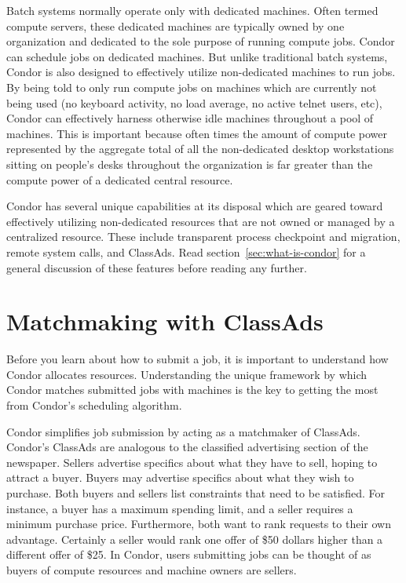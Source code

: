 Batch systems normally operate only with dedicated machines.  Often 
termed compute servers, these dedicated machines are typically owned by
one organization and dedicated to the sole purpose of running compute
jobs.  Condor can schedule jobs on dedicated machines.  But unlike traditional 
batch systems, Condor is also designed to effectively 
utilize non-dedicated machines to run jobs.  By being told to only
run compute jobs on machines which are currently not being used (no keyboard
activity, no load average, no active telnet users, etc), Condor can
effectively harness otherwise idle machines throughout a pool of machines.
This is important because often times the amount of
compute power represented by the aggregate total of all the non-dedicated 
desktop workstations sitting on people's desks throughout the
organization is far greater than the compute power of a dedicated
central resource.

Condor has several unique capabilities at its disposal which are geared 
toward effectively utilizing non-dedicated resources that are not owned or
managed by a centralized resource. These include transparent process
checkpoint and migration, remote system calls, and ClassAds.
Read section~\ref{sec:what-is-condor} for a general 
discussion of these features before reading any further.


\section{Matchmaking with ClassAds}
\label{sec:matchmaking-with-classads}

Before you learn about how to submit a job, it is important to
understand how Condor allocates resources. 
Understanding the
unique framework by which Condor matches submitted jobs with machines is
the key to getting the most from Condor's scheduling algorithm. 

Condor simplifies job submission by acting as a matchmaker of ClassAds.
Condor's ClassAds
are analogous to the classified advertising section of the
newspaper. Sellers advertise specifics about what they have to sell,
hoping to attract a buyer. Buyers may advertise specifics about what
they wish to purchase. Both buyers and sellers list constraints that
need to be satisfied.
For instance, a buyer has a maximum spending limit, 
and a seller requires a minimum purchase price.
Furthermore, both want to rank requests to their own advantage.
Certainly a seller would rank
one offer of \$50 dollars higher than a different
offer of \$25.
In Condor, users submitting
jobs can be thought of as buyers of compute resources and machine owners
are sellers. 

